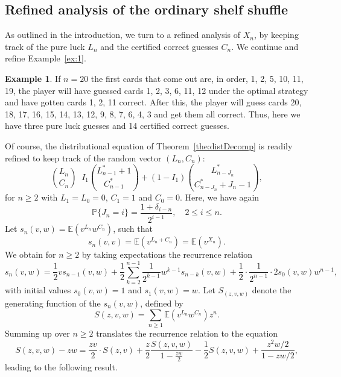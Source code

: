 \documentclass[10pt,reqno,a4paper]{amsart}
\theoremstyle{definition}
\newtheorem{example}{Example}
\def\P{{\mathbb {P}}}
\def\E{{\mathbb {E}}}
\DeclareMathOperator{\law}{\overset{\mathcal{L}}{=}}
\newcommand{\veca}[2]{\ensuremath{\binom{#1}{#2}}}
\begin{document}
\subsection{Refined analysis of the ordinary shelf shuffle}
As outlined in the introduction, we turn to a refined analysis of $X_n$, by keeping track of the pure luck $L_n$ and the certified correct guesses $C_n$. We continue and refine Example~\ref{ex:1}.

\begin{example}
\label{ex:2}
If $n = 20$ the first cards that come out are, in order, 1, 2, 5, 10, 11, 19, the player will have guessed cards 1, 2, 3, 6, 11, 12
under the optimal strategy and have gotten cards 1, 2, 11 correct. After this, the player will guess cards 20, 18, 17, 16, 15, 14, 13, 12, 9, 8, 7, 6, 4, 3 and get them all correct. Thus, here we have three pure luck guesses and 14 certified correct guesses.
\end{example}



Of course, the distributional equation of Theorem~\ref{the:distDecomp} is readily refined to keep track of the random vector $(L_n,C_n)$:
\begin{equation}
\label{eqn:DistNew1}
\veca{L_n}{C_n} \law I_1 \veca{L^{\ast}_{n-1}+1}{C^{\ast}_{n-1}} +(1-I_1)\veca{L^{\ast}_{n-J_n}}{C^{\ast}_{n-J_n}+J_n-1}, 
\end{equation}
for $n\ge 2$ with $L_1=L_0=0$, $C_1=1$ and $C_0=0$. Here, we have again
\[
\P\{J_n=i\}=\frac{1+\delta_{i-n}}{2^{i-1}},\quad 2\le i\le n.
\]
Let $s_n(v,w)=\E(v^{L_n}w^{C_n})$, such that 
\[
s_n(v,v)=\E(v^{L_n+C_n})=\E(v^{X_n}).
\]
We obtain for $n\ge 2$ by taking expectations the recurrence relation
\begin{equation}
\label{eq:recRefined1}
s_n(v,w)=\frac12 v s_{n-1}(v,w)+\frac12\sum_{k=2}^{n-1}\frac1{2^{k-1}}w^{k-1}s_{n-k}(v,w) + \frac12\cdot \frac1{2^{n-1}}\cdot 2s_0(v,w)w^{n-1},
\end{equation}
with initial values $s_0(v,w)=1$ and $s_1(v,w)=w$. Let $S_(z,v,w)$ denote the generating function of the $s_n(v,w)$, defined by
\[
S(z,v,w)=\sum_{n\ge 1}\E(v^{L_n}w^{C_n})z^n.
\]
Summing up over $n\ge 2$ translates the recurrence relation to the equation
\[
S(z,v,w)-zw=\frac{zv}2\cdot S(z,v)+\frac{z}2 \frac{S(z,v,w)}{1-\frac{zw}2}-\frac12 S(z,v,w)+\frac{z^2w/2}{1-zw/2},
\]
leading to the following result.
\end{document}
